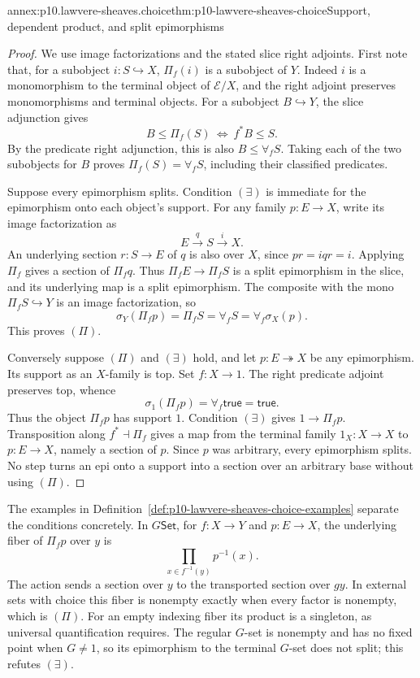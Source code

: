 \begin{annexitem}{annex:p10.lawvere-sheaves.choice}{thm:p10-lawvere-sheaves-choice}{Support, dependent product, and split epimorphisms}
\begin{proof}
We use image factorizations and the stated slice right adjoints.
First note that, for a subobject \(i:S\hookrightarrow X\),
\(\Pi_f(i)\) is a subobject of \(Y\).  Indeed \(i\) is a
monomorphism to the terminal object of \(\mathcal E/X\), and
the right adjoint preserves monomorphisms and terminal objects.
For a subobject \(B\hookrightarrow Y\), the slice adjunction
gives
\[
 B\leq\Pi_f(S)\ \Longleftrightarrow\ f^*B\leq S.
\]
By the predicate right adjunction, this is also
\(B\leq\forall_f S\).  Taking each of the two subobjects for
\(B\) proves \(\Pi_f(S)=\forall_f S\), including their
classified predicates.

Suppose every epimorphism splits.  Condition \((\exists)\)
is immediate for the epimorphism onto each object's support.
For any family \(p:E\to X\), write its image factorization as
\[
                 E\xrightarrow{q}S\xrightarrow{i}X.
\]
An underlying section \(r:S\to E\) of \(q\) is also over
\(X\), since \(pr=iqr=i\).  Applying \(\Pi_f\) gives a
section of \(\Pi_fq\).  Thus \(\Pi_fE\to\Pi_fS\) is a
split epimorphism in the slice, and its underlying map is a split
epimorphism.  The composite with the mono
\(\Pi_fS\hookrightarrow Y\) is an image factorization, so
\[
 \sigma_Y(\Pi_fp)=\Pi_fS=\forall_fS
                         =\forall_f\sigma_X(p).
\]
This proves \((\Pi)\).

Conversely suppose \((\Pi)\) and \((\exists)\) hold, and
let \(p:E\twoheadrightarrow X\) be any epimorphism.
Its support as an \(X\)-family is top.  Set \(f:X\to1\).
The right predicate adjoint preserves top, whence
\[
        \sigma_1(\Pi_fp)=\forall_f\mathsf{true}
                          =\mathsf{true}.
\]
Thus the object \(\Pi_fp\) has support \(1\).  Condition
\((\exists)\) gives \(1\to\Pi_fp\).  Transposition along
\(f^*\dashv\Pi_f\) gives a map from the terminal family
\(1_X:X\to X\) to \(p:E\to X\), namely a section of
\(p\).  Since \(p\) was arbitrary, every epimorphism splits.
No step turns an epi onto a support into a section over an arbitrary
base without using \((\Pi)\).
\end{proof}

The examples in Definition~\ref{def:p10-lawvere-sheaves-choice-examples}
separate the conditions concretely.  In \(G\mathsf{Set}\), for
\(f:X\to Y\) and \(p:E\to X\), the underlying fiber of
\(\Pi_fp\) over \(y\) is
\[
             \prod_{x\in f^{-1}(y)}p^{-1}(x).
\]
The action sends a section over \(y\) to the transported section
over \(gy\).  In external sets with choice this fiber is nonempty
exactly when every factor is nonempty, which is \((\Pi)\).
For an empty indexing fiber its product is a singleton, as universal
quantification requires.  The regular \(G\)-set is nonempty and
has no fixed point when \(G\ne1\), so its epimorphism to the
terminal \(G\)-set does not split; this refutes \((\exists)\).


\end{annexitem}

